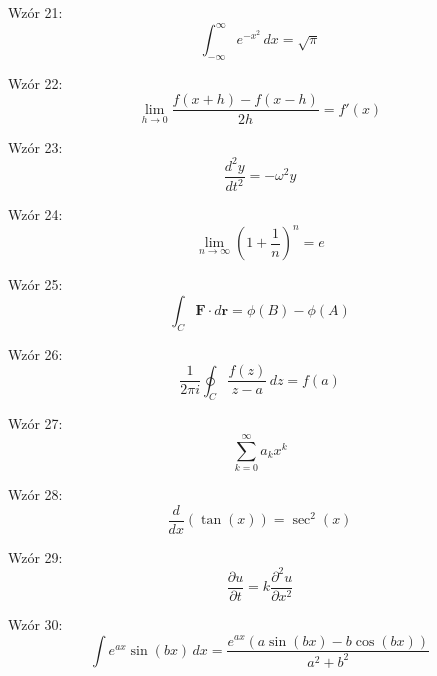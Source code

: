 \documentclass{article}
\begin{document}
Wzór 21:
\[ \int_{-\infty}^{\infty} e^{-x^2} \,dx = \sqrt{\pi} \]

Wzór 22:
\[ \lim_{{h \to 0}} \frac{f(x+h) - f(x-h)}{2h} = f'(x) \]

Wzór 23:
\[ \frac{d^2y}{dt^2} = -\omega^2y \]

Wzór 24:
\[ \lim_{{n \to \infty}} \left(1 + \frac{1}{n}\right)^n = e \]

Wzór 25:
\[ \int_{C} \mathbf{F} \cdot d\mathbf{r} = \phi(B) - \phi(A) \]

Wzór 26:
\[ \frac{1}{2\pi i} \oint_C \frac{f(z)}{z-a} \,dz = f(a) \]

Wzór 27:
\[ \sum_{k=0}^{\infty} a_k x^k \]

Wzór 28:
\[ \frac{d}{dx}\left(\tan(x)\right) = \sec^2(x) \]

Wzór 29:
\[ \frac{\partial u}{\partial t} = k \frac{\partial^2u}{\partial x^2} \]

Wzór 30:
\[ \int e^{ax} \sin(bx) \,dx = \frac{e^{ax}(a\sin(bx) - b\cos(bx))}{a^2 + b^2} \]
\end{document}
